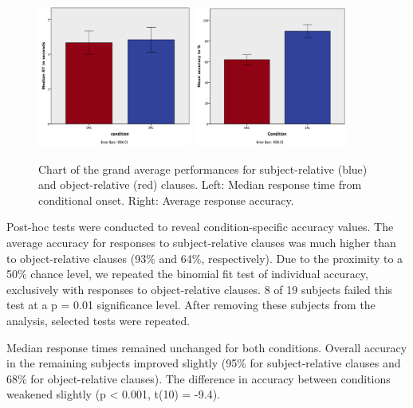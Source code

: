 \begin{figure}[h]
\begin{center}
\vspace{7mm}
\includegraphics[width=0.45\textwidth]{pics/2_RTgraph}
\includegraphics[width=0.45\textwidth]{pics/2_RAgraph}
\caption{\label{2.RTgraph} Chart of the grand average performances for subject-relative (blue) and object-relative (red) clauses. Left: Median response time from conditional onset. Right: Average response accuracy.}
\end{center}
\end{figure}

Post-hoc tests were conducted to reveal condition-specific accuracy values.
The average accuracy for responses to subject-relative clauses was much higher than to object-relative clauses (93\% and 64\%, respectively).
Due to the proximity to a 50\% chance level, we repeated the binomial fit test of individual accuracy, exclusively with responses to object-relative clauses.
8 of 19 subjects failed this test at a p = 0.01 significance level.
After removing these subjects from the analysis, selected tests were repeated.

Median response times remained unchanged for both conditions.
Overall accuracy in the remaining subjects improved slightly (95\% for subject-relative clauses and 68\% for object-relative clauses).
The difference in accuracy between conditions weakened slightly (p < 0.001, t(10) = -9.4).


